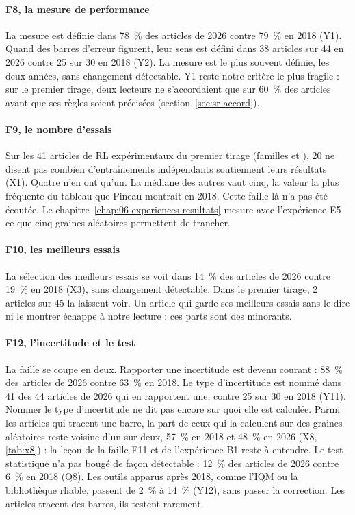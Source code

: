 \paragraph{F8, la mesure de performance}
La mesure est définie dans 78~\% des articles de 2026 contre 79~\% en 2018 (Y1). Quand des barres
d'erreur figurent, leur sens est défini dans 38 articles sur 44 en 2026 contre 25 sur 30 en 2018 (Y2).
La mesure est le plus souvent définie, les deux années, sans changement détectable. Y1 reste notre
critère le plus fragile : sur le premier tirage, deux lecteurs ne s'accordaient que sur 60~\% des
articles avant que ses règles soient précisées (section~\ref{sec:sr-accord}).

\paragraph{F9, le nombre d'essais}
Sur les 41 articles de RL expérimentaux du premier tirage (familles  et ), 20
ne disent pas combien d'entraînements indépendants soutiennent leurs résultats (X1). Quatre n'en ont
qu'un. La médiane des autres vaut cinq, la valeur la plus fréquente du tableau que Pineau montrait en
2018. Cette faille-là n'a pas été écoutée. Le chapitre~\ref{chap:06-experiences-resultats} mesure avec l'expérience E5
ce que cinq graines aléatoires permettent de trancher.

\paragraph{F10, les meilleurs essais}
La sélection des meilleurs essais se voit dans 14~\% des articles de 2026 contre 19~\% en 2018 (X3),
sans changement détectable. Dans le premier tirage, 2 articles sur 45 la laissent voir. Un article qui
garde ses meilleurs essais sans le dire ni le montrer échappe à notre lecture : ces parts sont des
minorants.

\paragraph{F12, l'incertitude et le test}
La faille se coupe en deux. Rapporter une incertitude est devenu courant : 88~\% des articles de 2026
contre 63~\% en 2018. Le type d'incertitude est nommé dans 41 des 44 articles de 2026 qui en rapportent
une, contre 25 sur 30 en 2018 (Y11). Nommer le type d'incertitude ne dit pas encore sur quoi elle est
calculée. Parmi les articles qui tracent une barre, la part de ceux qui la calculent sur des graines
aléatoires reste voisine d'un sur deux, 57~\% en 2018 et 48~\% en 2026 (X8, \cref{tab:x8}) : la leçon de la
faille F11 et de l'expérience B1 reste à entendre. Le test statistique n'a pas bougé de façon détectable : 12~\% des
articles de 2026 contre 6~\% en 2018 (Q8). Les outils apparus après 2018, comme l'IQM ou la bibliothèque
rliable, passent de 2~\% à 14~\% (Y12), sans passer la correction. Les articles tracent des barres, ils
testent rarement.

